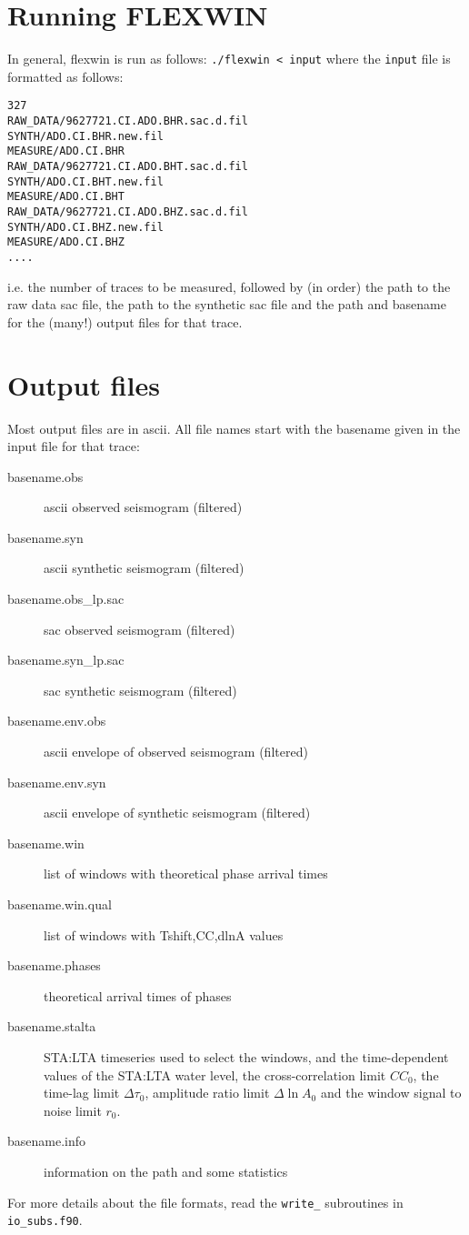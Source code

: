 \section{Running FLEXWIN}

In general, flexwin is run as follows: {\tt ./flexwin < input} where the {\tt input} file is formatted as follows:
{\small
\begin{verbatim}
327
RAW_DATA/9627721.CI.ADO.BHR.sac.d.fil
SYNTH/ADO.CI.BHR.new.fil
MEASURE/ADO.CI.BHR
RAW_DATA/9627721.CI.ADO.BHT.sac.d.fil
SYNTH/ADO.CI.BHT.new.fil
MEASURE/ADO.CI.BHT
RAW_DATA/9627721.CI.ADO.BHZ.sac.d.fil
SYNTH/ADO.CI.BHZ.new.fil
MEASURE/ADO.CI.BHZ
....
\end{verbatim}
}

i.e. the number of traces to be measured, followed by (in order) the path to
the raw data sac file, the path to the synthetic sac file and the path and
basename for the (many!) output files for that trace. 

\section{Output files}
Most output files are in ascii.  All file names start with the basename given
in the input file for that trace:
\begin{description}
\item[basename.obs]	ascii observed seismogram (filtered) 
\item[basename.syn]	ascii synthetic seismogram (filtered)
\item[basename.obs\_lp.sac] sac observed seismogram (filtered)
\item[basename.syn\_lp.sac] sac synthetic seismogram (filtered)
\item[basename.env.obs]	ascii envelope of observed seismogram (filtered)
\item[basename.env.syn]	ascii envelope of synthetic seismogram (filtered)
\item[basename.win]		list of windows with theoretical phase arrival times
\item[basename.win.qual]	list of windows with Tshift,CC,dlnA values 
\item[basename.phases]		theoretical arrival times of phases
\item[basename.stalta]		STA:LTA timeseries used to select the windows, and
the time-dependent values of the STA:LTA water level, the cross-correlation
limit $CC_0$, the time-lag limit $\Delta\tau_0$, amplitude ratio limit
$\Delta\ln{A}_0$ and the window signal to noise limit $r_0$.
\item[basename.info]	information on the path and some statistics
\end{description}
For more details about the file formats, read the {\tt write\_}
subroutines in {\tt io\_subs.f90}.

